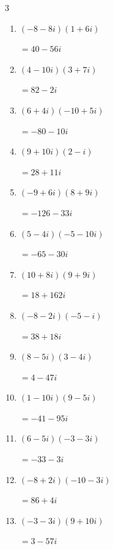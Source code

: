 \begin{multicols}{3}
\begin{enumerate}
  \itemsep=10pt
  \item $\displaystyle (-8-8i)(1+6i)$

        $\displaystyle =40-56i$

  \item $\displaystyle (4-10i)(3+7i)$

        $\displaystyle =82-2i$

  \item $\displaystyle (6+4i)(-10+5i)$

        $\displaystyle =-80-10i$

  \item $\displaystyle (9+10i)(2-i)$

        $\displaystyle =28+11i$

  \item $\displaystyle (-9+6i)(8+9i)$

        $\displaystyle =-126-33i$

  \item $\displaystyle (5-4i)(-5-10i)$

        $\displaystyle =-65-30i$

  \item $\displaystyle (10+8i)(9+9i)$

        $\displaystyle =18+162i$

  \item $\displaystyle (-8-2i)(-5-i)$

        $\displaystyle =38+18i$

  \item $\displaystyle (8-5i)(3-4i)$

        $\displaystyle =4-47i$

  \item $\displaystyle (1-10i)(9-5i)$

        $\displaystyle =-41-95i$

  \item $\displaystyle (6-5i)(-3-3i)$

        $\displaystyle =-33-3i$

  \item $\displaystyle (-8+2i)(-10-3i)$

        $\displaystyle =86+4i$

  \item $\displaystyle (-3-3i)(9+10i)$

        $\displaystyle =3-57i$


\end{enumerate}
\end{multicols}
